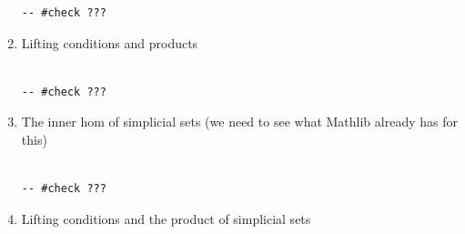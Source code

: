 \documentclass{book}
\theoremstyle{definition}
\newcounter{lcounter}
\begin{document}
\begin{enumerate}
\begin{center}
\begin{tcolorbox}[width=5in,colback={white},title={\begin{center}\texttt{Lean \thelcounter} \addtocounter{lcounter}{1}  \end{center}},colbacktitle=Blue,coltitle=black]
\begin{verbatim}
-- #check ???

\end{verbatim}
\end{tcolorbox}
\end{center}

\item Lifting conditions and products

\begin{center}
\begin{tcolorbox}[width=5in,colback={white},title={\begin{center}\texttt{Lean \thelcounter} \addtocounter{lcounter}{1}  \end{center}},colbacktitle=Blue,coltitle=black]
\begin{verbatim}

-- #check ???

\end{verbatim}
\end{tcolorbox}
\end{center}

\item The inner hom of simplicial sets (we need to see what Mathlib already has for this)

\begin{center}
\begin{tcolorbox}[width=5in,colback={white},title={\begin{center}\texttt{Lean \thelcounter} \addtocounter{lcounter}{1}  \end{center}},colbacktitle=Blue,coltitle=black]
\begin{verbatim}

-- #check ???

\end{verbatim}
\end{tcolorbox}
\end{center}

\item Lifting conditions and the product of simplicial sets

\begin{center}
\begin{tcolorbox}[width=5in,colback={white},title={\begin{center}\texttt{Lean \thelcounter} \addtocounter{lcounter}{1}  \end{center}},colbacktitle=Blue,coltitle=black]
\begin{verbatim}


\end{verbatim}
\end{tcolorbox}
\end{center}
\end{enumerate}
\end{document}
